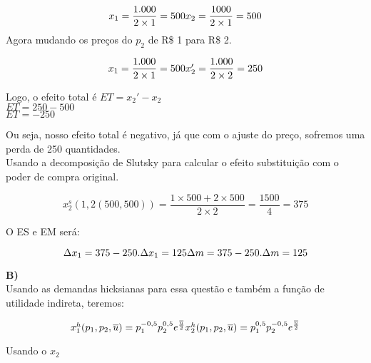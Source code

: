 \begin{flushleft}
\begin{equation}
x_{1} = \dfrac{1.000}{2 \times 1 } = 500
$$\\$$
x_{2} = \dfrac{1000}{2 \times 1} = 500
\end{equation}
Agora mudando os preços do $p_{2}$ de R\$ 1 para R\$ 2.

\begin{equation}
x_{1} = \dfrac{1.000}{2 \times 1} = 500
$$\\$$
x_{2}' = \dfrac{1.000}{2 \times 2} = 250
\end{equation}
\begin{center}
Logo, o efeito total é $ET = x_{2}' - x_{2}$
\\
$ET = 250 - 500$
\\
$ET = -250$ 
\end{center}
Ou seja, nosso efeito total é negativo, já que com o ajuste do preço, sofremos uma perda de 250 quantidades.
\\
Usando a decomposição de Slutsky para calcular o efeito substituição com o poder de compra original.

\begin{equation}
x_{2}^{s}(1,2(500,500)) = \dfrac{1 \times 500 + 2 \times 500}{2 \times 2} = \dfrac{1500}{4} = 375 
\end{equation}

\begin{center}
O ES e EM será:
\end{center}
\begin{equation}
\Delta x_{1} = 375 - 250.
$$\\$$
\Delta x_{1} = 125
$$\\$$
\Delta m = 375 - 250.
$$\\$$ 
\Delta m = 125
\end{equation}

\singlespacing

\textbf{B)}
\\
Usando as demandas hicksianas para essa questão e também a função de utilidade indireta, teremos:

\begin{equation}
$$\\$$
x_{1}^{h}(p_{1},p_{2}, \overline{u}) = p_{1}^{-0,5}p_{2}^{0,5}e^{\frac{\overline{u}}{2}}
$$\\$$
x_{2}^{h}(p_{1},p_{2}, \overline{u}) = p_{1}^{0,5}p_{2}^{-0,5}e^{\frac{\overline{u}}{2}}
\end{equation}

\begin{center}
Usando o $x_{2}$
\end{center}


\end{flushleft}
